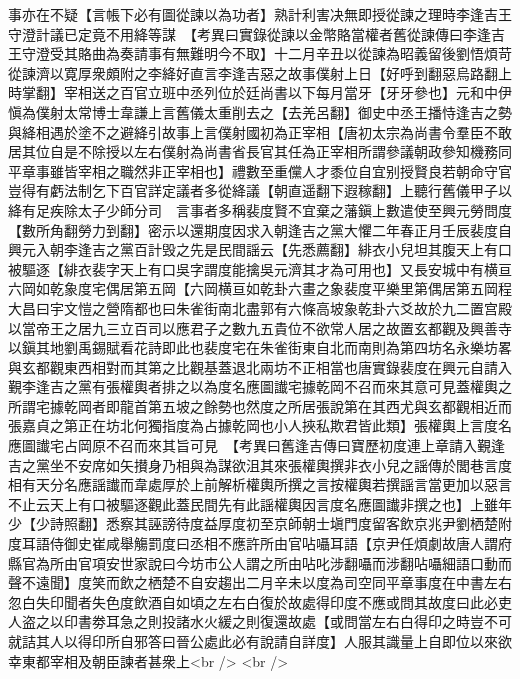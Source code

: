 事亦在不疑【言帳下必有圖從諫以為功者】熟計利害决無即授從諫之理時李逢吉王守澄計議已定竟不用絳等謀　【考異曰實錄從諫以金幣賂當權者舊從諫傳曰李逢吉王守澄受其賂曲為奏請事有無難明今不取】十二月辛丑以從諫為昭義留後劉悟煩苛從諫濟以寛厚衆頗附之李絳好直言李逢吉惡之故事僕射上日【好呼到翻惡烏路翻上時掌翻】宰相送之百官立班中丞列位於廷尚書以下每月當牙【牙牙參也】元和中伊愼為僕射太常博士韋謙上言舊儀太重削去之【去羌呂翻】御史中丞王播恃逢吉之勢與絳相遇於塗不之避絳引故事上言僕射國初為正宰相【唐初太宗為尚書令羣臣不敢居其位自是不除授以左右僕射為尚書省長官其任為正宰相所謂參議朝政參知機務同平章事雖皆宰相之職然非正宰相也】禮數至重儻人才黍位自宜别授賢良若朝命守官豈得有虧法制乞下百官詳定議者多從絳議【朝直遥翻下遐稼翻】上聽行舊儀甲子以絳有足疾除太子少師分司　言事者多稱裴度賢不宜棄之藩鎭上數遣使至興元勞問度【數所角翻勞力到翻】密示以還期度因求入朝逢吉之黨大懼二年春正月壬辰裴度自興元入朝李逢吉之黨百計毁之先是民間謡云【先悉薦翻】緋衣小兒坦其腹天上有口被驅逐【緋衣裴字天上有口吳字謂度能擒吳元濟其才為可用也】又長安城中有横亘六岡如乾象度宅偶居第五岡【六岡横亘如乾卦六畫之象裴度平樂里第偶居第五岡程大昌曰宇文愷之營隋都也曰朱雀街南北盡郭有六條高坡象乾卦六爻故於九二置宫殿以當帝王之居九三立百司以應君子之數九五貴位不欲常人居之故置玄都觀及興善寺以鎭其地劉禹錫賦看花詩即此也裴度宅在朱雀街東自北而南則為第四坊名永樂坊畧與玄都觀東西相對而其第之比觀基蓋退北兩坊不正相當也唐實錄裴度在興元自請入覲李逢吉之黨有張權輿者排之以為度名應圖䜟宅據乾岡不召而來其意可見蓋權輿之所謂宅據乾岡者即龍首第五坡之餘勢也然度之所居張說第在其西尤與玄都觀相近而張嘉貞之第正在坊北何獨指度為占據乾岡也小人挾私欺君皆此類】張權輿上言度名應圖䜟宅占岡原不召而來其旨可見　【考異曰舊逢吉傳曰寶歷初度連上章請入覲逢吉之黨坐不安席如矢攅身乃相與為謀欲沮其來張權輿撰非衣小兒之謡傳於閭巷言度相有天分名應謡䜟而韋處厚於上前解析權輿所撰之言按權輿若撰謡言當更加以惡言不止云天上有口被驅逐觀此蓋民間先有此謡權輿因言度名應圖䜟非撰之也】上雖年少【少詩照翻】悉察其誣謗待度益厚度初至京師朝士塡門度留客飲京兆尹劉栖楚附度耳語侍御史崔咸舉觴罰度曰丞相不應許所由官呫囁耳語【京尹任煩劇故唐人謂府縣官為所由官項安世家說曰今坊市公人謂之所由呫叱涉翻囁而涉翻呫囁細語口動而聲不遠聞】度笑而飲之栖楚不自安趨出二月辛未以度為司空同平章事度在中書左右忽白失印聞者失色度飲酒自如頃之左右白復於故處得印度不應或問其故度曰此必吏人盗之以印書劵耳急之則投諸水火緩之則復還故處【或問當左右白得印之時豈不可就詰其人以得印所自邪答曰晉公處此必有說請自詳度】人服其識量上自即位以來欲幸東都宰相及朝臣諫者甚衆上<br />
<br />
